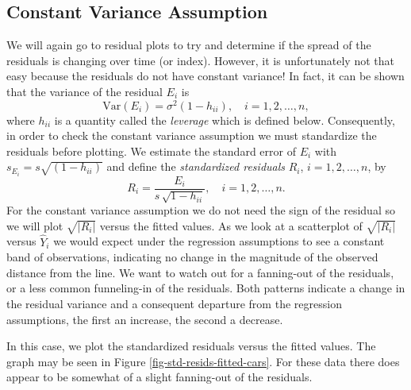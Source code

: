 \documentclass[captions=tableheading]{scrbook}
\begin{document}
\subsection{Constant Variance Assumption}
\label{sec-11-4-2}
\label{sub-Constant-Variance-Assumption}


We will again go to residual plots to try and determine if the spread of the residuals is changing over time (or index). However, it is unfortunately not that easy because the residuals do not have constant variance! In fact, it can be shown that the variance of the residual \(E_{i}\) is 
\begin{equation}
\mbox{Var$(E_{i})$}=\sigma^{2}(1-h_{ii}),\quad i=1,2,\ldots,n,
\end{equation}
where \(h_{ii}\) is a quantity called the \emph{leverage} which is defined below. Consequently, in order to check the constant variance assumption we must standardize the residuals before plotting. We estimate the standard error of \(E_{i}\) with \(s_{E_{i}}=s\sqrt{(1-h_{ii})}\) and define the \emph{standardized residuals} \(R_{i}\), \(i=1,2,\ldots,n\), by 
\begin{equation} 
R_{i}=\frac{E_{i}}{s\,\sqrt{1-h_{ii}}},\quad i=1,2,\ldots,n.
\end{equation}
For the constant variance assumption we do not need the sign of the residual so we will plot \(\sqrt{|R_{i}|}\) versus the fitted values. As we look at a scatterplot of \(\sqrt{|R_{i}|}\) versus \(\hat{Y}_{i}\) we would expect under the regression assumptions to see a constant band of observations, indicating no change in the magnitude of the observed distance from the line. We want to watch out for a fanning-out of the residuals, or a less common funneling-in of the residuals. Both patterns indicate a change in the residual variance and a consequent departure from the regression assumptions, the first an increase, the second a decrease.

In this case, we plot the standardized residuals versus the fitted values. The graph may be seen in Figure \ref{fig-std-resids-fitted-cars}. For these data there does appear to be somewhat of a slight fanning-out of the residuals.
\end{document}
